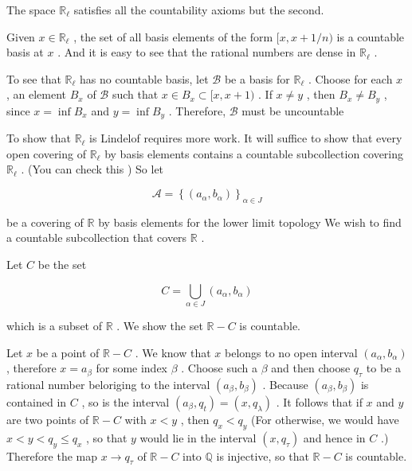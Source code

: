 \begin{centeredblock}
\begin{example}
	The space \({\mathbb{R}}_{\ell }\) satisfies all the countability axioms but the second.

Given \(x \in  {\mathbb{R}}_{\ell }\) , the set of all basis elements of the form \(\lbrack x,x + 1/n)\) is a countable basis at \(x\) . And it is easy to see that the rational numbers are dense in \({\mathbb{R}}_{\ell }\) .

To see that \({\mathbb{R}}_{\ell }\) has no countable basis, let \(\mathcal{B}\) be a basis for \({\mathbb{R}}_{\ell }\) . Choose for each \(x\) , an element \({B}_{x}\) of \(\mathcal{B}\) such that \(x \in  {B}_{x} \subset  \lbrack x,x + 1)\) . If \(x \neq  y\) , then \({B}_{x} \neq  {B}_{y}\) , since \(x = \inf {B}_{x}\) and \(y = \inf {B}_{y}\) . Therefore, \(\mathcal{B}\) must be uncountable

To show that \({\mathbb{R}}_{\ell }\) is Lindelof requires more work. It will suffice to show that every open covering of \({\mathbb{R}}_{\ell }\) by basis elements contains a countable subcollection covering \({\mathbb{R}}_{\ell }\) . (You can check this ) So let

\[
\mathcal{A} = {\left\{  \left( {a}_{\alpha },{b}_{\alpha }\right) \right\}  }_{\alpha  \in  J}
\]

be a covering of \(\mathbb{R}\) by basis elements for the lower limit topology We wish to find a countable subcollection that covers \(\mathbb{R}\) .

Let \(C\) be the set

\[
C = \mathop{\bigcup }\limits_{{\alpha  \in  J}}\left( {{a}_{\alpha },{b}_{\alpha }}\right)
\]

which is a subset of \(\mathbb{R}\) . We show the set \(\mathbb{R} - C\) is countable.

Let \(x\) be a point of \(\mathbb{R} - C\) . We know that \(x\) belongs to no open interval \(\left( {{a}_{\alpha },{b}_{\alpha }}\right)\) , therefore \(x = {a}_{\beta }\) for some index \(\beta\) . Choose such a \(\beta\) and then choose \({q}_{\tau }\) to be a rational number beloriging to the interval \(\left( {{a}_{\beta },{b}_{\beta }}\right)\) . Because \(\left( {{a}_{\beta },{b}_{\beta }}\right)\) is contained in \(C\) , so is the interval \(\left( {{a}_{\beta },{q}_{t}}\right)  = \left( {x,{q}_{\lambda }}\right)\) . It follows that if \(x\) and \(y\) are two points of \(\mathbb{R} - C\) with \(x < y\) , then \({q}_{x} < {q}_{y}\) (For otherwise, we would have \(x < y < {q}_{y} \leq  {q}_{x}\) , so that \(y\) would lie in the interval \(\left( {x,{q}_{\tau }}\right)\) and hence in \(C\) .) Therefore the map \(x \rightarrow  {q}_{\tau }\) of \(\mathbb{R} - C\) into \(\mathbb{Q}\) is injective, so that \(\mathbb{R} - C\) is countable.


\end{example}
\end{centeredblock}
